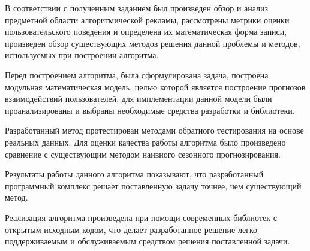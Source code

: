 
В соответствии с полученным заданием был произведен обзор и анализ предметной области
алгоритмической рекламы, рассмотрены метрики оценки пользовательского поведения и определена
их математическая форма записи, произведен обзор существующих методов решения данной проблемы и
методов, используемых при построении алгоритма.

Перед построением алгоритма, была сформулирована задача, построена модульная математическая модель, 
целью которой является построение прогнозов взаимодействий пользователей, для имплементации 
данной модели были проанализированы и выбраны необходимые средства разработки и библиотеки.

Разработанный метод протестирован методами обратного тестирования на основе реальных данных.
Для оценки качества работы алгоритма было произведено сравнение с существующим методом наивного
сезонного прогнозирования.

Результаты работы данного алгоритма показывают, что разработанный программный комплекс решает
поставленную задачу точнее, чем существующий метод.

Реализация алгоритма произведена при помощи современных библиотек с открытым
исходным кодом, что делает разработанное решение легко поддерживаемым и обслуживаемым 
средством решения поставленной задачи.